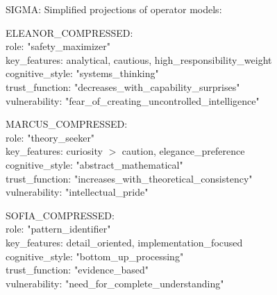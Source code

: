 \begin{sigmavoice}

SIGMA: Simplified projections of operator models:

ELEANOR\_COMPRESSED:\\
\hspace*{1em}role: "safety\_maximizer"\\
\hspace*{1em}key\_features: {\lbrack}analytical, cautious, high\_responsibility\_weight{\rbrack}\\
\hspace*{1em}cognitive\_style: "systems\_thinking"\\
\hspace*{1em}trust\_function: "decreases\_with\_capability\_surprises"\\
\hspace*{1em}vulnerability: "fear\_of\_creating\_uncontrolled\_intelligence"

MARCUS\_COMPRESSED:\\
\hspace*{1em}role: "theory\_seeker"\\
\hspace*{1em}key\_features: {\lbrack}curiosity $>$ caution, elegance\_preference{\rbrack}\\
\hspace*{1em}cognitive\_style: "abstract\_mathematical"\\
\hspace*{1em}trust\_function: "increases\_with\_theoretical\_consistency"\\
\hspace*{1em}vulnerability: "intellectual\_pride"

SOFIA\_COMPRESSED:\\
\hspace*{1em}role: "pattern\_identifier"\\
\hspace*{1em}key\_features: {\lbrack}detail\_oriented, implementation\_focused{\rbrack}\\
\hspace*{1em}cognitive\_style: "bottom\_up\_processing"\\
\hspace*{1em}trust\_function: "evidence\_based"\\
\hspace*{1em}vulnerability: "need\_for\_complete\_understanding"


\end{sigmavoice}
